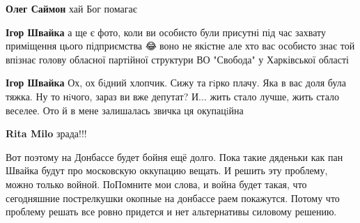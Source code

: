 \begin{itemize}
\begin{itemize}
\textbf{Олег Саймон} хай Бог помагає 🙏

 
\textbf{Ігор Швайка} а ще є фото, коли ви особисто були присутні під час
захвату приміщення цього підприємства 😂🥴\Laughey[1.0][white] воно не якістне але хто вас
особисто знає той впізнає голову обласної партійної структури ВО "Свобода" у
Харківської області

 
\textbf{Ігор Швайка} Ох, ох бiдний хлопчик. Сижу та гiрко плачу. Яка в вас доля
була тяжка. Ну то нiчого, зараз ви вже депутат? И... жить стало лучше, жить
стало веселее. Ото й в мене залишалась звичка ця окупацiйна

 
\textbf{Rita Milo} зрада!!!

 

Вот поэтому на Донбассе будет бойня ещё долго. Пока такие дяденьки как пан
Швайка будут про московскую оккупацию вещать. И решить эту проблему, можно
только войной. ПоПомните мои слова, и война будет такая, что сегодняшние
пострелкушки окопные на донбассе раем покажутся. Потому что проблему решать все
ровно придется и нет альтернативы силовому решению.


 

\end{itemize}
\end{itemize}
